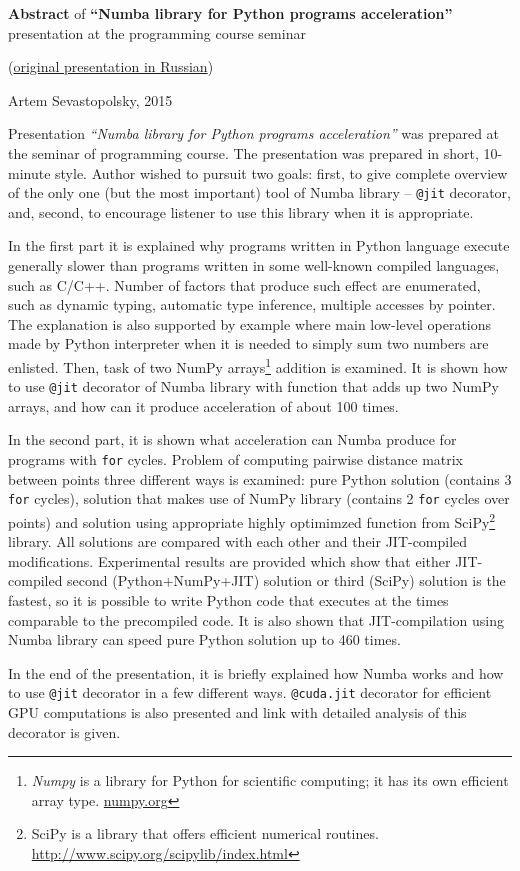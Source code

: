\documentclass[11pt]{article}
\begin{document}
	{\large {\bf Abstract} of {\bf``Numba library for Python programs acceleration''} presentation at the programming course seminar
	
	 (\href{http://www.machinelearning.ru/wiki/images/0/0a/Numba_presentation.pdf}{original presentation in Russian})
	\newline
	
	{Artem Sevastopolsky, 2015}}
	\newline
	\newline
	\newline
	\par
	Presentation \emph{``Numba library for Python programs acceleration''} was prepared at the seminar of programming course. The presentation was prepared in short, 10-minute style. Author wished to pursuit two goals: first, to give complete overview of the only one (but the most important) tool of Numba library -- \texttt{@jit} decorator, and, second, to encourage listener to use this library when it is appropriate. \newline
	
	In the first part it is explained why programs written in Python language execute generally slower than programs written in some well-known compiled languages, such as C/C++. Number of factors that produce such effect are enumerated, such as dynamic typing, automatic type inference, multiple accesses by pointer. The explanation is also supported by example where main low-level operations made by Python interpreter when it is needed to simply sum two numbers are enlisted. Then, task of two NumPy arrays\footnote{\emph{Numpy} is a library for Python for scientific computing; it has its own efficient array type. \url{numpy.org}} addition is examined. It is shown how to use \texttt{@jit} decorator of Numba library with function that adds up two NumPy arrays, and how can it produce acceleration of about 100 times.
	
	In the second part, it is shown what acceleration can Numba produce for programs with \texttt{for} cycles. Problem of computing pairwise distance matrix between points three different ways is examined: pure Python solution (contains 3 \texttt{for} cycles), solution that makes use of NumPy library (contains 2 \texttt{for} cycles over points) and solution using appropriate highly optimimzed function from SciPy\footnote{SciPy is a library that offers efficient numerical routines. \url{http://www.scipy.org/scipylib/index.html}} library. All solutions are compared with each other and their JIT-compiled modifications. Experimental results are provided which show that either JIT-compiled second (Python+NumPy+JIT) solution or third (SciPy) solution is the fastest, so it is possible to write Python code that executes at the times comparable to the precompiled code. It is also shown that JIT-compilation using Numba library can speed pure Python solution up to 460 times. 
	
	In the end of the presentation, it is briefly explained how Numba works and how to use \texttt{@jit} decorator in a few different ways. \texttt{@cuda.jit} decorator for efficient GPU computations is also presented and link with detailed analysis of this decorator is given.
\end{document}

